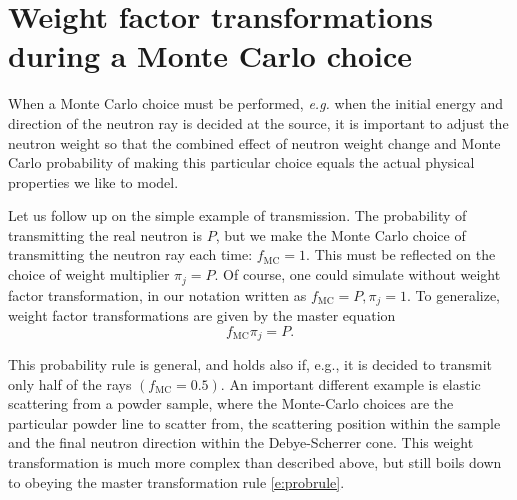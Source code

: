 \section{Weight factor transformations during a Monte Carlo
 choice}
\label{s:weighttransform}

When a Monte Carlo choice must be performed, {\em e.g.} when the
initial energy and direction of the neutron ray is decided at the source,
it is important to adjust the neutron weight so that the combined
effect of neutron weight change and Monte Carlo probability
of making this particular choice
equals the actual physical properties we like to model.

Let us follow up on the simple example of transmission.
The probability of transmitting the real neutron is $P$, but we make
the Monte Carlo choice of transmitting the neutron ray each time:
$f_\mathrm{MC}=1$. This must be reflected on the choice of weight multiplier
$\pi_j=P$. Of course, one could simulate without weight factor
transformation, in our notation written as $f_\mathrm{MC}=P, \pi_j=1$. To
generalize, weight factor transformations are given by the master equation
\begin{equation} \label{e:probrule}
f_\mathrm{MC} \pi_j = P .
\end{equation}

This probability rule is general, and holds also if, e.g., it is decided to
transmit only half of the rays $(f_\mathrm{MC}=0.5)$.
An important different example
is elastic scattering from a powder sample,
where the Monte-Carlo choices are the particular powder line to scatter from,
the scattering position within the sample and the final neutron direction
within the Debye-Scherrer cone. This weight transformation is much more complex than described above, but still boils down to obeying the master transformation rule \ref{e:probrule}.

